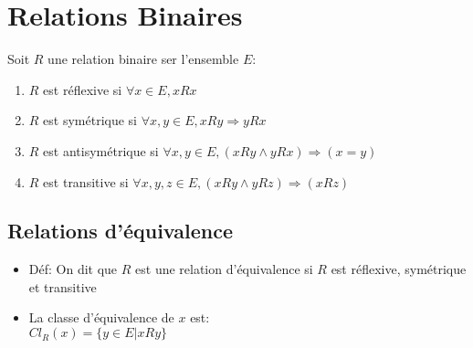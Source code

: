 \documentclass[fleqn]{article}
\theoremstyle{definition} \newtheorem*{defi}{D\'efinition}
\theoremstyle{plain} \newtheorem*{theo}{Th\'eor\`eme}
\begin{document}
\section{Relations Binaires}
Soit \(R\) une relation binaire ser l'ensemble \(E\):
\begin{enumerate}
	\item \(R\) est r\'eflexive si \(\forall x \in E, xRx\)
	\item \(R\) est sym\'etrique si \(\forall x,y \in E, xRy \Rightarrow yRx\)
	\item \(R\) est antisym\'etrique si \(\forall x,y \in E, (xRy \land yRx) \Rightarrow (x=y)\)
	\item \(R\) est transitive si \(\forall x,y,z \in E, (xRy \land yRz) \Rightarrow (xRz)\)
\end{enumerate}

\subsection{Relations d'\'equivalence}
\begin{itemize}
	\item D\'ef: On dit que \(R\) est une relation d'\'equivalence si \(R\) est r\'eflexive, sym\'etrique et transitive
	\item La classe d'\'equivalence de \(x\) est: \\
		\(Cl_R(x) = \{y \in E |xRy\}\)
\end{itemize}
\end{document}
